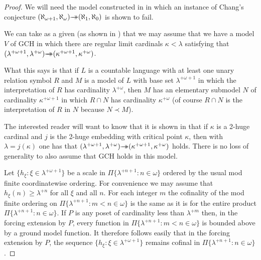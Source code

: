 \documentclass{amsart}
\theoremstyle{plain}
\theoremstyle{definition}
\theoremstyle{remark}
\theoremstyle{plain}
\theoremstyle{definition}
\theoremstyle{remark}
\begin{document}
            \begin{proof}
            We will need the model constructed in \cite{MR1045371} in
             which an instance of Chang's conjecture
             $(\aleph_{\omega+1},\aleph_\omega) \rlap{$\rightarrow$}\,{\rightarrow}
             (\aleph_1,\aleph_0)$ is shown to fail.

            We can take as a given (as shown in \cite[Theorem 5]{MR1045371}) that we may
            assume that we have a model $V$
            of GCH in which there are regular limit cardinals $\kappa<\lambda$
            satisfying that
            $(\lambda^{+\omega+1},\lambda^{+\omega})\rlap{$\rightarrow$}\,{\rightarrow}
            (\kappa^{+\omega+1},\kappa^{+\omega})$.


            What this says is that if $L$ is a countable language
            with at least one unary relation symbol $R$ and
             $M$ is a model of $L$  with base set $\lambda^{+\omega+1}$
            in which the interpretation of $R$ has cardinality
             $\lambda^{+\omega}$, then $M$ has an elementary submodel
             $N$ of cardinality $\kappa^{+\omega+1}$ in which
            $R\cap N$ has cardinality $\kappa^{+\omega}$ (of course
             $R\cap N$ is the interpretation of $R$ in $N$ because
            $N\prec M$).

            The interested reader will want to know that it is shown in
            \cite{MR1045371} that if $\kappa$ is a 2-huge cardinal
            and $j$ is the 2-huge
            embedding with critical point $\kappa$, then with
             $\lambda = j(\kappa)$ one has that
            $(\lambda^{+\omega+1},\lambda^{+\omega})\rlap{$\rightarrow$}\,{\rightarrow}
            (\kappa^{+\omega+1},\kappa^{+\omega})$ holds. There is no loss of
            generality to  also assume that GCH holds in this model.

            \bigskip

            Let $\{ h_\xi : \xi \in \lambda^{+\omega+1}\}$
            be a scale in $\Pi\{ \lambda^{+n+1} : n\in \omega\}$
             ordered by the usual mod finite coordinatewise
            ordering. For convenience we may assume that $h_\xi(n) \geq
            \lambda^{+n}$ for all $\xi$ and all $n$. For each integer
             $m$ the cofinality of the mod finite ordering on
             $\Pi\{ \lambda^{+n+1} : m< n\in \omega\}$
            is the same as it is for the entire product
             $\Pi\{ \lambda^{+n+1} : n\in \omega\}$. If $P$
            is any poset of cardinality less than
             $\lambda^{+m}$ then, in the forcing extension by $P$,
            every function in
             $\Pi\{ \lambda^{+n+1} : m< n\in \omega\}$ is bounded
            above by a ground model function.
            It therefore
            follows easily that  in the forcing
            extension by $P$,  the sequence
            $\{ h_\xi : \xi \in \lambda^{+\omega+1}\}$  remains cofinal in
             $\Pi\{ \lambda^{+n+1} : n\in \omega\}$.


\end{proof}
\end{document}
